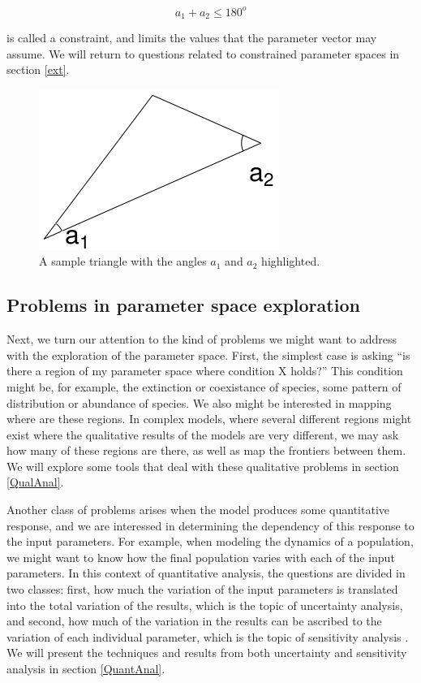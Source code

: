 \begin{equation}
	a_1 + a_2 \leq 180 ^o
	\label{samplecond}
\end{equation}

is called a constraint, and limits the values that the parameter vector
may assume. We will return to questions related to constrained parameter
spaces in section \ref{ext}.

\begin{figure}[htbp]
	\begin{center}
		\includegraphics[width=200 pt]{fig/figTriangle.png}
	\end{center}
	\caption{A sample triangle with the angles $a_1$ and $a_2$ highlighted.}
	\label{fig:triangle}
\end{figure}

\subsection{Problems in parameter space exploration}\label{PSE}
Next, we turn our attention to the kind of problems we might want to address
with the exploration of the parameter space. First, the simplest case is asking
``is there a region of my parameter space where condition X holds?'' This 
condition might be, for example, the extinction or coexistance of species, 
some pattern of distribution or abundance of species. We also might be 
interested in mapping where are these regions. In complex models, where several 
different regions might exist where the qualitative results of the models are 
very different, we may ask how many of these regions are there, as well as map
the frontiers between them. We will explore some tools that deal with these 
qualitative problems in section \ref{QualAnal}.

Another class of problems arises when the model produces some quantitative 
response, and we are interessed in determining the dependency of this response 
to the input parameters. For example, when modeling the dynamics of a 
population, we might want to know how the final population varies with each 
of the input parameters. In this context of quantitative analysis, the 
questions are divided in two classes: first, how much the variation of the 
input parameters is translated into the total variation of the results, 
which is the topic of uncertainty analysis, 
and second, how much of the variation in the results can be ascribed to the 
variation of each individual parameter, which is the topic of sensitivity 
analysis \cite{Helton03, Helton05}. We will present the techniques and results
from both uncertainty and sensitivity analysis in section \ref{QuantAnal}.


